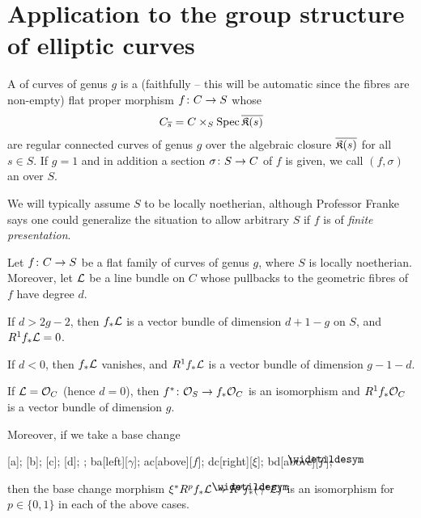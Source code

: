 \documentclass[a4paper,parskip=half,numbers=enddot, DIV=12]{scrreprt}
\begin{document}
\section{Application to the group structure of elliptic curves}
\begin{defi}
	A  of curves of genus $g$ is a (faithfully -- this will be automatic since the fibres are non-empty) flat proper morphism $f\colon C\morphism S$ whose 
	\begin{align*}
		C_{\overline{s}}=C\times_S\operatorname{Spec}\overline{\mathfrak{K}(s)}
	\end{align*}
	are regular connected curves of genus $g$ over the algebraic closure $\overline{\mathfrak{K}(s)}$ for all $s\in S$. If $g=1$ and in addition a section  $\sigma\colon S\morphism C$  of $f$ is given, we call $(f,\sigma)$ an  over $S$.
\end{defi}
We will typically assume $S$ to be locally noetherian, although Professor Franke says one could generalize the situation to allow arbitrary $S$ if $f$ is of \emph{finite presentation}.
\begin{prop}
	Let $f\colon C\morphism S$ be a flat family of curves of genus $g$, where $S$ is locally noetherian. Moreover, let $\mathcal{L}$ be a line bundle on $C$ whose pullbacks to the geometric fibres of $f$ have degree $d$.
	\begin{alphanumerate}
		\item If $d>2g-2$, then $f_*\mathcal{L}$ is a vector bundle of dimension $d+1-g$ on $S$, and $R^1f_*\mathcal{L}=0$.
		\item If $d<0$, then $f_*\mathcal{L}$ vanishes, and $R^1f_*\mathcal{L}$ is a vector bundle of dimension $g-1-d$.
		\item If $\mathcal{L}=\mathcal{O}_C$ (hence $d=0$), then $f^*\colon \Oo_S\morphism f_*\Oo_C$ is an isomorphism and $R^1f_*\mathcal{O}_C$ is a vector bundle of dimension $g$.
	\end{alphanumerate}
	Moreover, if we take a base change
	\begin{diagram*}
		[a];
		[b];
		[c];
		[d];
		;
		\scriptsize
		\arrow ba[left][$\gamma$];
		\arrow ac[above][$f$];
		\arrow dc[right][$\xi$];
		\arrow bd[above][$\snake{f}$];
	\end{diagram*}
	then the base change morphism $\xi^*R^pf_*\Ll\morphism R^p\snake{f}_*(\gamma^*\Ll)$ is an isomorphism for $p\in\{0,1\}$ in each of the above cases.
\end{prop}
\end{document}
